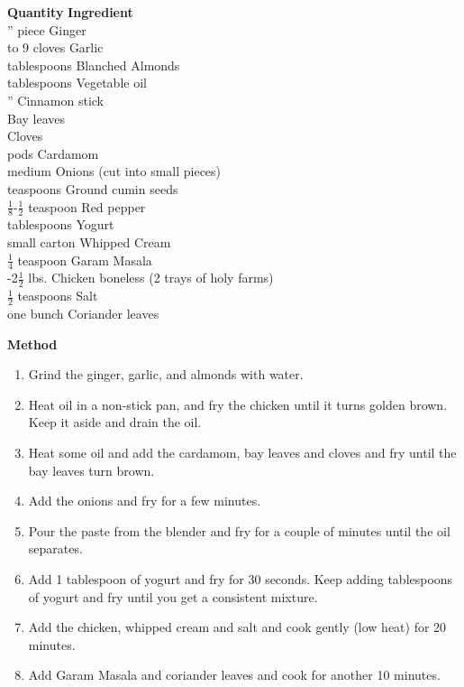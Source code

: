 \begin{tabbing}
\hspace{1.0cm}  \={\bf Quantity}   \hspace{3.0cm} \={\bf Ingredient}\\
 '' piece  \>Ginger\\
  to 9 cloves   \>Garlic\\
  tablespoons   \>Blanched Almonds\\
  tablespoons   \>Vegetable oil\\
 ''   \>Cinnamon stick\\
    \>Bay leaves\\
    \>Cloves\\
  pods   \>Cardamom\\
   medium   \>Onions  (cut into small pieces)\\
  teaspoons   \>Ground cumin seeds\\
 \>$\frac{1}{8}$-$\frac{1}{2}$ teaspoon   \>Red pepper\\
  tablespoons   \>Yogurt\\
  small carton   \>Whipped Cream\\
 \>$\frac{1}{4}$ teaspoon   \>Garam Masala\\
 -2$\frac{1}{2}$ lbs.    \>Chicken boneless (2 trays of holy farms)\\
  $\frac{1}{2}$ teaspoons   \>Salt\\
 \>one bunch   \>Coriander leaves\\
\end{tabbing}

{\bf Method}
\begin{enumerate}
   \item Grind the ginger, garlic, and almonds with water.
   \item Heat oil in a non-stick pan, and fry the chicken until it turns golden
      brown. Keep it aside and drain the oil.
   \item Heat some oil and add the cardamom, bay leaves and  cloves  and  fry
      until the bay leaves turn brown.
   \item Add the onions and fry for a few minutes.
   \item Pour the paste from the blender and fry for a couple of minutes until
      the oil separates.
   \item Add 1 tablespoon of yogurt and  fry  for  30  seconds.  Keep  adding
      tablespoons of yogurt and fry until you get a consistent mixture.
   \item Add  the  chicken, whipped cream and salt and cook gently (low heat)
      for 20 minutes.
   \item Add Garam Masala and coriander  leaves  and  cook  for  another  10
      minutes.
\end{enumerate}

